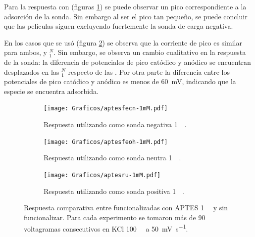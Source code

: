 			Para la respuesta con \fe\space (figuras \ref{fig:aptes1mM-vc-fe}) se puede observar un pico correspondiente a la adsorción de la sonda. Sin embargo al ser el pico tan pequeño, se puede concluir que las películas siguen excluyendo fuertemente la sonda de carga negativa.

			En los casos que se usó \fc\space (figura \ref{fig:aptes1mM-vc-fc}) se observa que la corriente de pico es similar para ambos, \pdmZ\space y \pdmZ$^N_1$. Sin embargo, se observa un cambio cualitativo en la respuesta de la sonda: la diferencia de potenciales de pico catódico y anódico se encuentran desplazados en las \pdmZ$^N_1$ respecto de las \pdmZ. Por otra parte la diferencia entre los potenciales de pico catódico y anódico es menos de \SI{60}{\milli\volt}, indicando que la especie se encuentra adsorbida. 

				 \begin{figure}[ht!]	
					\begin{subfigure}[t]{0.495\textwidth}
			 	    \texttt{[image: Graficos/aptesfecn-1mM.pdf]}
			        \caption{Respuesta utilizando como sonda negativa \ferroferri\space \SI{1}{\milli\Molar}.}
			        \label{fig:aptes1mM-vc-fe}
			        \end{subfigure}
			        \begin{subfigure}[t]{0.495\textwidth}
			 	    \texttt{[image: Graficos/aptesfeoh-1mM.pdf]}
			        \caption{Respuesta utilizando como sonda neutra \fc\space \SI{1}{\milli\Molar}.}
			        \label{fig:aptes1mM-vc-fc}
			        \end{subfigure}
			        \begin{center}
			        \begin{subfigure}[t]{0.60\textwidth}
			 	    \texttt{[image: Graficos/aptesru-1mM.pdf]}
			        \caption{Respuesta utilizando como sonda positiva \aminorutenio\space \SI{1}{\milli\Molar}.}
			        \label{fig:aptes1mM-vc-ru}
			        \end{subfigure}
			        \end{center}
			        \caption[Voltagramas de \pdmZ$^P_3$ con \aminorutenio\space y \ferroferri]{Respuesta comparativa entre \pdmZ\space funcionalizadas con APTES \SI{1}{\milli\Molar} y sin funcionalizar. Para cada experimento se tomaron más de 90 voltagramas consecutivos en KCl \SI{100}{\milli\Molar} a \SI{50}{\milli\volt\per\second}.}
			        \label{fig:aptes1mM-vc}
			      	\end{figure}

